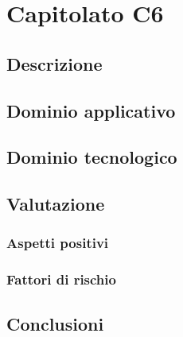 \documentclass[../StudioDiFattibilita.tex]{subfiles}
\begin{document}
	\section{Capitolato C6}
		\subsection{Descrizione}
		\subsection{Dominio applicativo}
		\subsection{Dominio tecnologico}
		\subsection{Valutazione}
			\subsubsection{Aspetti positivi}
			\subsubsection{Fattori di rischio}
			\subsection{Conclusioni}
\end{document}
